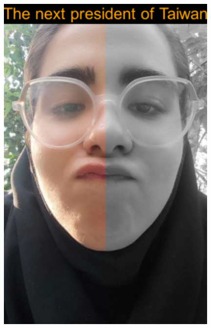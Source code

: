 \documentclass[
]{article}
\begin{document}
\includegraphics[width=4.33in]{processed_image}
\end{document}
